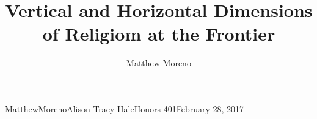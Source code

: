 \documentclass[10.5pt,letterpaper]{article}
\title{Vertical and Horizontal Dimensions of Religiom at the Frontier}\let\Title\@title
\author{Matthew Moreno}
\begin{document}
\begin{mla}{Matthew}{Moreno}{Alison Tracy Hale}{Honors 401}{February 28, 2017}{{ \Title}\vspace{-1ex}}









\newpage




\end{mla}
\end{document}
